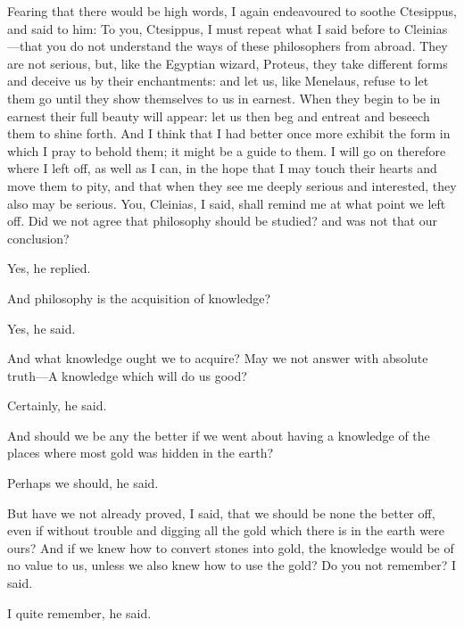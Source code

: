 \documentclass[11pt,letter]{article}
\begin{document}
\par  Fearing that there would be high words, I again endeavoured to soothe Ctesippus, and said to him: To you, Ctesippus, I must repeat what I said before to Cleinias—that you do not understand the ways of these philosophers from abroad. They are not serious, but, like the Egyptian wizard, Proteus, they take different forms and deceive us by their enchantments: and let us, like Menelaus, refuse to let them go until they show themselves to us in earnest. When they begin to be in earnest their full beauty will appear: let us then beg and entreat and beseech them to shine forth. And I think that I had better once more exhibit the form in which I pray to behold them; it might be a guide to them. I will go on therefore where I left off, as well as I can, in the hope that I may touch their hearts and move them to pity, and that when they see me deeply serious and interested, they also may be serious. You, Cleinias, I said, shall remind me at what point we left off. Did we not agree that philosophy should be studied? and was not that our conclusion?

\par  Yes, he replied.

\par  And philosophy is the acquisition of knowledge?

\par  Yes, he said.

\par  And what knowledge ought we to acquire? May we not answer with absolute truth—A knowledge which will do us good?

\par  Certainly, he said.

\par  And should we be any the better if we went about having a knowledge of the places where most gold was hidden in the earth?

\par  Perhaps we should, he said.

\par  But have we not already proved, I said, that we should be none the better off, even if without trouble and digging all the gold which there is in the earth were ours? And if we knew how to convert stones into gold, the knowledge would be of no value to us, unless we also knew how to use the gold? Do you not remember? I said.

\par  I quite remember, he said.
\end{document}
